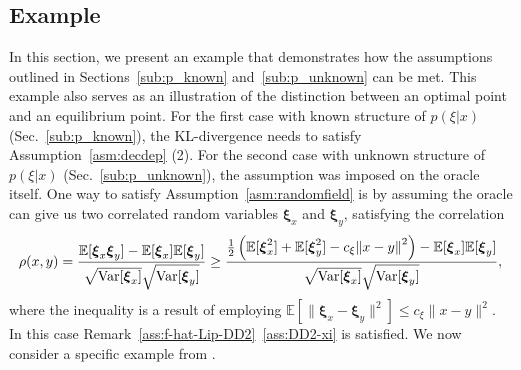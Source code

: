\documentclass[11pt,reqno]{amsart}
\newcommand{\1}{{\bf 1}}
\newcommand{\2}{{\bf 2}}
\newcommand{\hb}[1]{\color{blue}{#1}}
\newcommand{\us}[1]{\textcolor{red}{#1}}
\newcommand{\bxi}{\boldsymbol{\xi}}
\numberwithin{equation}{section}
\theoremstyle{remark}
\begin{document}
{
			\subsection{Example}\label{subsec:marketproblem}
			In this section, we present an example that demonstrates how the assumptions outlined in Sections~\ref{sub:p_known} and~\ref{sub:p_unknown} can be met. This example also serves as an illustration of the distinction between an optimal point and an equilibrium point.  For the first case with known structure of $p(\xi | x)$ (Sec.~\ref{sub:p_known}), the KL-divergence needs to satisfy Assumption~\ref{asm:decdep} (2).
			For the second case with unknown structure of $p(\xi | x)$ (Sec.~\ref{sub:p_unknown}), the assumption was imposed on the oracle itself. One way to satisfy Assumption~\ref{asm:randomfield} is by assuming the oracle can give us two correlated random variables $\bxi_x$ and $\bxi_y$, satisfying the correlation
			\begin{equation}\label{eq:rho}
				\rho({x,y})  = \frac{\mathbb{E}[\bxi_x\bxi_y]-\mathbb{E}[\bxi_x]\mathbb{E}[\bxi_y]}{\sqrt{\textnormal{Var}[\bxi_x]}\sqrt{\textnormal{Var}[\bxi_y]}}
				\geq \frac{\frac{1}{2}\left(\mathbb{E}[\bxi_x^2]+\mathbb{E}[\bxi_y^2]-c_\xi{\|x-y\|}^2\right)-\mathbb{E}[\bxi_x]\mathbb{E}[\bxi_y]}{\sqrt{\textnormal{Var}[\bxi_x]}\sqrt{\textnormal{Var}[\bxi_y]}},
			\end{equation} 
			{where the inequality is a result of employing $\mathbb{E} [ \|\bxi_x - \bxi_y\|^2 ] \le  c_\xi\|x-y\|^2.$} In this case Remark~\ref{ass:f-hat-Lip-DD2}~\eqref{ass:DD2-xi} is satisfied. %
			We now consider a specific example from \cite{wang2023constrained}.\\
			
}
\end{document}
